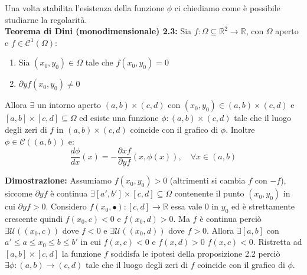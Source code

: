 \documentclass[a4paper,11pt,titlepage]{book}
\begin{document}
Una volta stabilita l'esistenza della funzione $\phi$ ci chiediamo come è possibile studiarne la regolarità. \\

\textbf{Teorema di Dini (monodimensionale) 2.3:} Sia $f:\Omega\subseteq\mathbb{R}^2\to\mathbb{R}$, con $\Omega$ aperto e $f\in\mathcal{C}^1(\Omega)$:
\begin{enumerate}
\item Sia $(x_0,y_0)\in\Omega$ tale che $f(x_0,y_0)=0$
\item $\partial y f(x_0,y_0)\ne 0$
\end{enumerate}

Allora $\exists$ un intorno aperto $(a,b)\times(c,d)$ con $(x_0,y_0)\in(a,b)\times (c,d)$ e $[a,b]\times[c,d]\subseteq\Omega$ ed esiste una funzione $\phi:(a,b)\times(c,d)$ tale che il luogo degli zeri di $f$ in $(a,b)\times(c,d)$ coincide con il grafico di $\phi$. Inoltre $\phi\in\mathcal{C}((a,b))$ e: $$\frac{d\phi}{dx}(x)= - \frac{\partial xf}{\partial yf} (x,\phi(x)),\quad \forall x \in (a,b)$$

\textbf{Dimostrazione:} Assumiamo $f(x_0,y_0)>0$ (altrimenti si cambia $f$ con $-f$), siccome $\partial y f$ è continua  $\exists [a',b']\times[c,d]\subseteq\Omega$ contenente il punto $(x_0,y_0)$ in cui $\partial y f>0$. Considero $f(x_0,\bullet):[c,d]\to\mathbb{R}$ essa vale 0 in $y_0$ ed è strettamente crescente quindi $f(x_0,c)<0$ e $f(x_0,d)>0$. Ma $f$ è continua perciò $\exists\mathcal{U}((x_0,c))$ dove $f<0$ e $\exists\mathcal{U}((x_0,d))$ dove $f>0$. Allora $\exists [a,b]$ con $a'\leq a \leq x_0 \leq b \leq b'$ in cui $f(x,c)<0$ e $f(x,d)>0$ $f(x,c)<0$. Ristretta ad $[a,b]\times[c,d]$ la funzione $f$ soddisfa le ipotesi della proposizione 2.2 perciò $\exists\phi:(a,b)\to(c,d)$ tale che il luogo degli zeri di $f$ coincide con il grafico di $\phi$.\\
\end{document}
